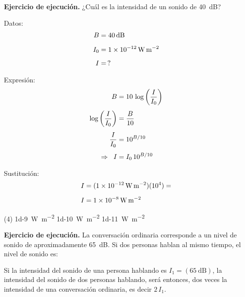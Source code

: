 \documentclass[12pt, letter]{exam}
\begin{document}
\begin{questions}
    \setcounter{question}{8} \question \textbf{Ejercicio de ejecución.} ¿Cuál es la intensidad de un sonido de \SI{40}{\dB}?

    \begin{minipage}[t]{0.35\linewidth}
    Datos: 
    \begin{align*}
    B &= \SI{40}{\dB} \\[0.5em]
    I_{0} &= \SI{1d-12}{\watt\per\square\meter} \\[0.5em]
    I &= \, ?
    \end{align*}
    \end{minipage}
    \hspace{1cm}
    \begin{minipage}[t]{0.4\linewidth}
    Expresión:
    \begin{align*}
    B &= 10 \, \log \left( \dfrac{I}{I_{0}} \right)\\[0.4em]
    \log \left( \dfrac{I}{I_{0}} \right) &= \dfrac{B}{10} \\[0.4em]
    \dfrac{I}{I_{0}} &= 10^{B/10} \\[0.4em] 
    \Rightarrow \hspace*{0.2cm} I &= I_{0} \, 10^{B/10}
    \end{align*}
    \end{minipage}

    Sustitución:
    \begin{align*}
    I &= (\SI{1d-12}{\watt\per\square\meter})(10^{4}) = \\[0.5em]
    I &= \SI{1d-8}{\watt\per\square\meter}
    \end{align*}
    \begin{tasks}(4)
       \task {}
       \task \SI{1d-9}{\watt\per\square\meter}
       \task \SI{1d-10}{\watt\per\square\meter}
       \task \SI{1d-11}{\watt\per\square\meter}
    \end{tasks}
    \setcounter{question}{9} \question \textbf{Ejercicio de ejecución.} La conversación ordinaria corresponde a un nivel de sonido de aproximadamente \SI{65}{\dB}. Si dos personas hablan al mismo tiempo, el nivel de sonido es:

    \vspace{0.4cm}
    Si la intensidad del sonido de una persona hablando es $I_{1} = (\SI{65}{\dB})$, la intensidad del sonido de dos personas hablando, será entonces, dos veces la intensidad de una conversación ordinaria, es decir $2 \, I_{1}$.


\end{questions}
\end{document}
